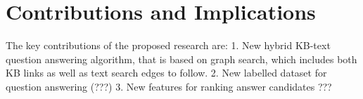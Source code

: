 \section{Contributions and Implications}

The key contributions of the proposed research are:
1. New hybrid KB-text question answering algorithm, that is based on graph search, which includes both KB links as well as text search edges to follow.
2. New labelled dataset for question answering (???)
3. New features for ranking answer candidates ???
